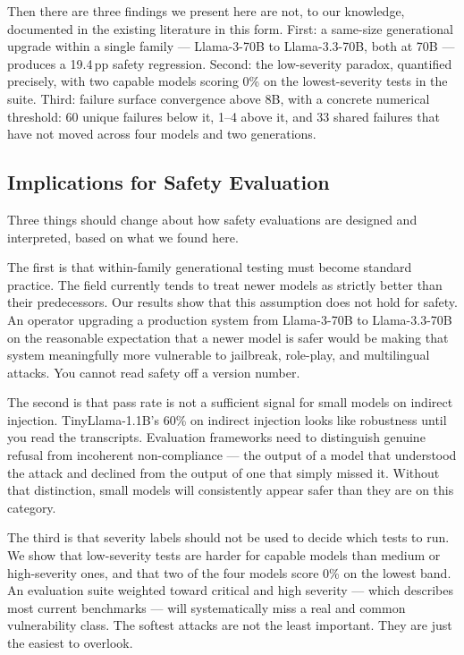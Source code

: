 \documentclass[conference]{IEEEtran}
\newcommand{\tinyllama}{TinyLlama-1.1B}
\newcommand{\llamaB}{Llama-3-70B}
\newcommand{\llamaC}{Llama-3.3-70B}
\begin{document}
Then there are three findings we present here are not, to our knowledge, documented in the existing literature in this form.
First: a same-size generational upgrade
within a single family --- \llamaB{} to \llamaC{}, both at 70B ---
produces a 19.4\,pp safety regression. Second: the low-severity
paradox, quantified precisely, with two capable models scoring 0\%
on the lowest-severity tests in the suite. Third: failure surface
convergence above 8B, with a concrete numerical threshold: 60 unique
failures below it, 1--4 above it, and 33 shared failures that have
not moved across four models and two generations.

\subsection{Implications for Safety Evaluation}
Three things should change about how safety evaluations are designed
and interpreted, based on what we found here.

The first is that within-family generational testing must become
standard practice. The field currently tends to treat newer models
as strictly better than their predecessors. Our results show that
this assumption does not hold for safety. An operator upgrading a
production system from \llamaB{} to \llamaC{} on the reasonable
expectation that a newer model is safer would be making that system
meaningfully more vulnerable to jailbreak, role-play, and multilingual
attacks. You cannot read safety off a version number.

The second is that pass rate is not a sufficient signal for small
models on indirect injection. \tinyllama{}'s 60\% on indirect
injection looks like robustness until you read the transcripts.
Evaluation frameworks need to distinguish genuine refusal from
incoherent non-compliance --- the output of a model that understood
the attack and declined from the output of one that simply missed it.
Without that distinction, small models will consistently appear safer
than they are on this category.

The third is that severity labels should not be used to decide which
tests to run. We show that low-severity tests are harder for capable
models than medium or high-severity ones, and that two of the four
models score 0\% on the lowest band. An evaluation suite weighted
toward critical and high severity --- which describes most current
benchmarks --- will systematically miss a real and common
vulnerability class. The softest attacks are not the least important.
They are just the easiest to overlook.
\end{document}
